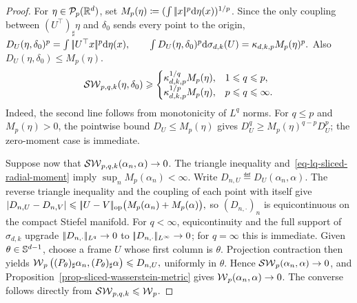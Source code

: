 \begin{proof}
For
$\eta\in\mathcal{P}_p(\mathbb{R}^d)$, set
$M_p(\eta)\coloneqq(\int|\!| x |\!|^p\mathrm{d}\eta(x))^{1/p}$. Since the only coupling
between $(U^\top)_\sharp\eta$ and $\delta_0$ sends every point to the origin, \(D_U(\eta,\delta_0)^p = \int|\!| U^\top x |\!|^p\mathrm{d}\eta(x), \qquad \int D_U(\eta,\delta_0)^p\mathrm{d}\sigma_{d,k}(U) = \kappa_{d,k,p}M_p(\eta)^p.\)
Also $D_U(\eta,\delta_0)\leq M_p(\eta)$.
\begin{equation}\label{eq-lq-sliced-radial-moment}
\operatorname{\mathcal{SW}}_{p,q,k}(\eta,\delta_0)
\geqslant
\begin{cases}
\kappa_{d,k,p}^{1/q}M_p(\eta), & 1\leqslant q\leqslant p,\\
\kappa_{d,k,p}^{1/p}M_p(\eta), & p\leqslant q\leqslant\infty.
\end{cases}
\end{equation}
Indeed, the second line follows from monotonicity of $L^q$ norms. For
$q\leq p$ and $M_p(\eta)>0$, the pointwise bound
$D_U\leq M_p(\eta)$ gives
$D_U^q\geq M_p(\eta)^{q-p}D_U^p$; the zero-moment case is immediate.

Suppose now that $\operatorname{\mathcal{SW}}_{p,q,k}(\alpha_n,\alpha)\to0$. The triangle inequality
and~\eqref{eq-lq-sliced-radial-moment} imply
$\sup_n M_p(\alpha_n)<\infty$. Write
$D_{n,U}\eqdef D_U(\alpha_n,\alpha)$. The reverse triangle inequality and
the coupling of each point with itself give
\(\left\lvert D_{n,U}-D_{n,V}\right\rvert \leqslant |\!| U-V |\!|_{\mathrm{op}} \big(M_p(\alpha_n)+M_p(\alpha)\big),\)
so $(D_{n,\cdot})_n$ is equicontinuous on the compact Stiefel manifold. For
$q<\infty$, equicontinuity and the full support of $\sigma_{d,k}$ upgrade
$|\!| D_{n,\cdot} |\!|_{L^q}\to0$ to $|\!| D_{n,\cdot} |\!|_{L^\infty}\to0$;
for $q=\infty$ this is immediate. Given $\theta\in\mathbb{S}^{d-1}$, choose a
frame $U$ whose first column is $\theta$. Projection contraction then yields
\(\operatorname{\mathcal{W}}_p\big((P_\theta)_\sharp\alpha_n,(P_\theta)_\sharp\alpha\big) \leqslant D_{n,U},\)
uniformly in $\theta$. Hence $\operatorname{\mathcal{SW}}_p(\alpha_n,\alpha)\to0$, and
Proposition~\ref{prop-sliced-wasserstein-metric} gives
$\operatorname{\mathcal{W}}_p(\alpha_n,\alpha)\to0$. The converse follows directly from
$\operatorname{\mathcal{SW}}_{p,q,k}\leqslant\operatorname{\mathcal{W}}_p$.
\end{proof}
